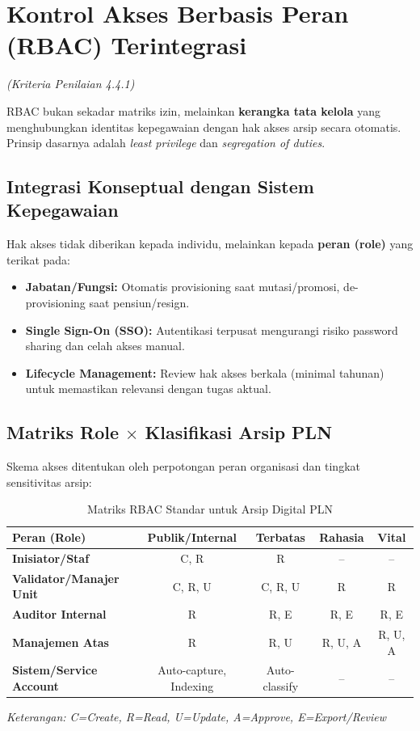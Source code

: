 \documentclass[12pt,a4paper]{report}
\begin{document}
\newpage
\chapter{Kontrol Akses Berbasis Peran (RBAC) Terintegrasi}
\textit{(Kriteria Penilaian 4.4.1)}

RBAC bukan sekadar matriks izin, melainkan \textbf{kerangka tata kelola} yang menghubungkan identitas kepegawaian dengan hak akses arsip secara otomatis. Prinsip dasarnya adalah \textit{least privilege} dan \textit{segregation of duties}.

\section{Integrasi Konseptual dengan Sistem Kepegawaian}
Hak akses tidak diberikan kepada individu, melainkan kepada \textbf{peran (role)} yang terikat pada:
\begin{itemize}[leftmargin=*]
    \item \textbf{Jabatan/Fungsi:} Otomatis provisioning saat mutasi/promosi, de-provisioning saat pensiun/resign.
    \item \textbf{Single Sign-On (SSO):} Autentikasi terpusat mengurangi risiko password sharing dan celah akses manual.
    \item \textbf{Lifecycle Management:} Review hak akses berkala (minimal tahunan) untuk memastikan relevansi dengan tugas aktual.
\end{itemize}

\section{Matriks Role $\times$ Klasifikasi Arsip PLN}
Skema akses ditentukan oleh perpotongan peran organisasi dan tingkat sensitivitas arsip:

\begin{table}[htbp]
\centering
\small
\caption{Matriks RBAC Standar untuk Arsip Digital PLN}
\begin{tabularx}{\textwidth}{@{} l c c c c @{}}
\toprule
\textbf{Peran (Role)} & \textbf{Publik/Internal} & \textbf{Terbatas} & \textbf{Rahasia} & \textbf{Vital} \\
\midrule
\textbf{Inisiator/Staf} & C, R & R & -- & -- \\
\textbf{Validator/Manajer Unit} & C, R, U & C, R, U & R & R \\
\textbf{Auditor Internal} & R & R, E & R, E & R, E \\
\textbf{Manajemen Atas} & R & R, U & R, U, A & R, U, A \\
\textbf{Sistem/Service Account} & Auto-capture, Indexing & Auto-classify & -- & -- \\
\bottomrule
\end{tabularx}
\end{table}
\textit{Keterangan: C=Create, R=Read, U=Update, A=Approve, E=Export/Review}
\end{document}
